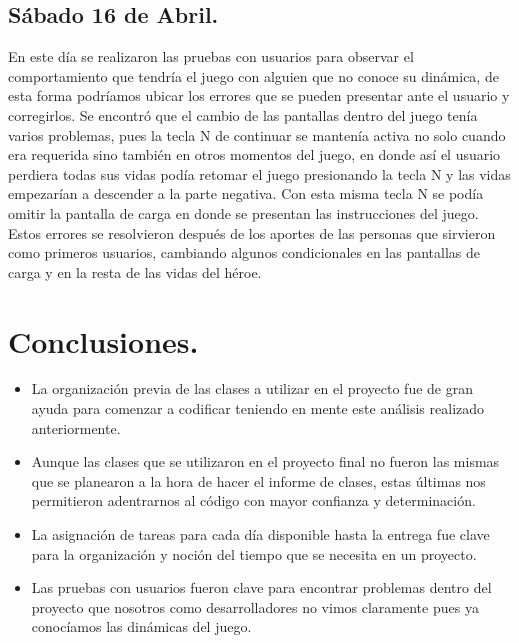 \documentclass{article}
\begin{document}
\subsection{Sábado 16 de Abril.}
En este día se realizaron las pruebas con usuarios para observar el comportamiento que tendría el juego con alguien que no conoce su dinámica, de esta forma podríamos ubicar los errores que se pueden presentar ante el usuario y corregirlos.
Se encontró que el cambio de las pantallas dentro del juego tenía varios problemas, pues la tecla N de continuar se mantenía activa no solo cuando era requerida sino también en otros momentos del juego, en donde así el usuario perdiera todas sus vidas podía retomar el juego presionando la tecla N y las vidas empezarían a descender a la parte negativa. Con esta misma tecla N se podía omitir la pantalla de carga en donde se presentan las instrucciones del juego.
Estos errores se resolvieron después de los aportes de las personas que sirvieron como primeros usuarios, cambiando algunos condicionales en las pantallas de carga y en la resta de las vidas del héroe.


\section{Conclusiones.}
\begin{itemize}
    \item La organización previa de las clases a utilizar en el proyecto fue de gran ayuda para comenzar a codificar teniendo en mente este análisis realizado anteriormente.
    \item Aunque las clases que se utilizaron en el proyecto final no fueron las mismas que se planearon a la hora de hacer el informe de clases, estas últimas nos permitieron adentrarnos al código con mayor confianza y determinación.
    \item La asignación de tareas para cada día disponible hasta la entrega fue clave para la organización y noción del tiempo que se necesita en un proyecto.
    \item Las pruebas con usuarios fueron clave para encontrar problemas dentro del proyecto que nosotros como desarrolladores no vimos claramente pues ya conocíamos las dinámicas del juego.
\end{itemize}
\end{document}
